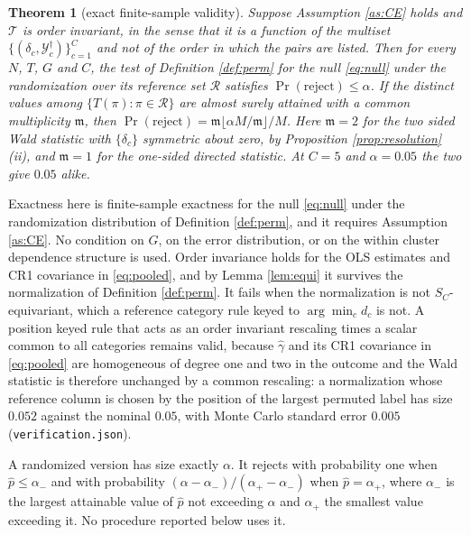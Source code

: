 \documentclass[12pt]{article}
\newtheorem{theorem}{Theorem}
\theoremstyle{definition}
\numberwithin{equation}{section}
\begin{document}
\begin{theorem}[exact finite-sample validity]
\label{thm:exact}
Suppose Assumption \ref{as:CE} holds and $\mathcal{T}$ is order invariant, in
the sense that it is a function of the multiset
$\{(\delta_c,\mathcal{Y}^{\dagger}_c)\}_{c=1}^C$ and not of the order in which
the pairs are listed. Then for every $N$, $T$, $G$ and $C$, the test of
Definition \ref{def:perm} for the null \eqref{eq:null} under the randomization
over its reference set $\mathcal{R}$ satisfies $\Pr(\text{reject}) \le \alpha$.
If the distinct values among $\{T(\pi): \pi \in \mathcal{R}\}$ are almost surely
attained with a common multiplicity $\mathfrak{m}$, then $\Pr(\text{reject}) =
\mathfrak{m} \lfloor \alpha M/\mathfrak{m} \rfloor / M$. Here $\mathfrak{m} = 2$ for the
two sided Wald statistic with $\{\delta_c\}$ symmetric about zero, by
Proposition \ref{prop:resolution}(ii), and $\mathfrak{m} = 1$ for the one-sided directed statistic. At $C = 5$ and $\alpha = 0.05$ the two give $0.05$ alike.
\end{theorem}

Exactness here is finite-sample exactness for the null \eqref{eq:null} under the
randomization distribution of Definition \ref{def:perm}, and it requires
Assumption \ref{as:CE}. No condition on $G$, on the error distribution, or on
the within cluster dependence structure is used. Order invariance holds for the
OLS estimates and CR1 covariance in \eqref{eq:pooled}, and by Lemma
\ref{lem:equi} it survives the normalization of Definition \ref{def:perm}. It
fails when the normalization is not $S_C$-equivariant, which a reference category
rule keyed to $\arg\min_c d_c$ is not. A position keyed rule that acts as an
order invariant rescaling times a scalar common to all categories remains valid,
because $\hat{\gamma}$ and its CR1 covariance in \eqref{eq:pooled} are
homogeneous of degree one and two in the outcome and the Wald statistic is
therefore unchanged by a common rescaling: a normalization whose reference
column is chosen by the position of the largest permuted label has size $0.052$
against the nominal $0.05$, with Monte Carlo standard error $0.005$
(\texttt{verification.json}).

A randomized version has size exactly $\alpha$. It rejects with probability one
when $\hat{p} \le \alpha_-$ and with probability $(\alpha-\alpha_-)/
(\alpha_+-\alpha_-)$ when $\hat{p} = \alpha_+$, where $\alpha_-$ is the largest
attainable value of $\hat{p}$ not exceeding $\alpha$ and $\alpha_+$ the smallest
value exceeding it. No procedure reported below uses it.
\end{document}

